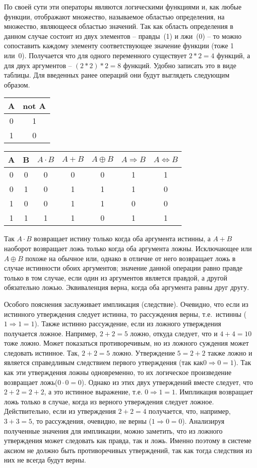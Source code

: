 \documentclass[a4paper, fleqn]{article}
\begin{document}
	По своей сути эти операторы являются логическими функциями и, как любые функции, отображают множество, называемое областью определения,  на множество, являющееся областью значений. Так как область определения в данном случае состоит из двух элементов -- правды~(1) и лжи~(0) -- то можно сопоставить каждому элементу соответствующее значение функции (тоже 1 или~0). Получается что для одного переменного существует $2*2=4$ функций, а для двух аргументов -- $(2*2)*2=8$ функций. Удобно записать это в виде таблицы. Для введенных ранее операций они будут выглядеть следующим образом.
	
	\begin{tabular}{c|c}
		A&  not A\\ 
		\hline  
		0&  1\\ 
		1&  0\\  
	\end{tabular} \qquad \qquad
	\begin{tabular}{cc|c|c|c|c|c}
		A&  B&  $A \cdot B$&  $A+B$&  $A \oplus B$& $A\Rightarrow B$&  $A \Leftrightarrow B$\\ 
		\hline
		0&  0&  0&  0&  0&	1&  1\\ 
		0&  1&  0&  1&  1&	1&  0\\ 
		1&  0&  0&  1&  1&	0&  0\\ 
		1&  1&  1&  1&  0&	1&  1\\ 
	\end{tabular} 
	
	Так $A \cdot B$ возвращает истину только когда оба аргумента истинны, а $A+B$ наоборот возвращает ложь только когда оба аргумента ложны. Исключающее или $A \oplus B$ похоже на обычное или, однако в отличие от него возвращает ложь в случае истинности обоих аргументов; значение данной операции равно правде только в том случае, если один из аргументов является правдой, а другой обязательно ложью. 
	Эквиваленция верна, когда оба аргумента равны друг другу.
	
	Особого пояснения заслуживает импликация (следствие). Очевидно, что если из истинного утверждения следует истинна, то рассуждения верны, т.е.~истинны ($1\Rightarrow 1 = 1$). Также истинно рассуждение, если из ложного утверждения получается ложное. Например, $2+2 = 5$ ложно, откуда следует, что и $4+4=10$ тоже ложно. Может показаться противоречивым, но из ложного суждения может следовать истинное. Так, $2+2 = 5$ ложно. Утверждение $5=2+2$ также ложно и является справедливым следствием первого утверждения (так как$0 \Rightarrow 0 = 1$). Так как эти утверждения ложны одновременно, то их логическое произведение возвращает ложь($0\cdot 0 = 0$). Однако из этих двух утверждений вместе следует, что $2+2 = 2+2$, а это истинное выражение, т.е. $0 \Rightarrow 1 = 1$. Импликация возвращает ложь только в случае, когда из верного утверждения следует ложное. Действительно, если из утверждения $2+2=4$ получается, что, например, $3+3=5$, то рассуждения, очевидно, не верны ($1 \Rightarrow 0 = 0$). Анализируя полученные значения для импликации, можно заметить, что из ложного утверждения может следовать как правда, так и ложь. Именно поэтому в системе аксиом не должно быть противоречивых утверждений, так как тогда следствия из них не всегда будут верны. 
	
\end{document}
